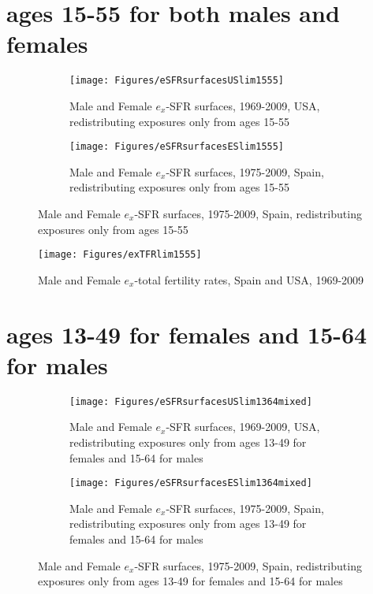 \section{ages 15-55 for both males and females}
\label{sec:1555}
\begin{figure}[ht!]
        \centering
        \begin{subfigure}
                \centering
                \caption{Male and Female $e_x$-SFR surfaces, 1969-2009, USA,
                redistributing exposures only from ages 15-55}
                \texttt{[image: Figures/eSFRsurfacesUSlim1555]}
                \label{fig:exSFRsurfUSlim15_55}
        \end{subfigure}
        \begin{subfigure}
                \centering
                \caption{Male and Female $e_x$-SFR surfaces, 1975-2009, Spain,
                redistributing exposures only from ages 15-55}
                \texttt{[image: Figures/eSFRsurfacesESlim1555]} 
                \label{fig:exSFRsurfESlim15_55}
        \end{subfigure}
\end{figure}

\begin{figure}[ht!]
        \centering  
          \caption{Male and Female $e_x$-total fertility rates, Spain
          and USA, 1969-2009}
           \texttt{[image: Figures/exTFRlim1555]}
          \label{fig:exTFRlim15_55}
\end{figure}
\pagebreak
\FloatBarrier

\section{ages 13-49 for females and 15-64 for males}
\label{sec:1364}
\begin{figure}[ht!]
        \centering
        \begin{subfigure}
                \centering
                \caption{Male and Female $e_x$-SFR surfaces, 1969-2009, USA,
                redistributing exposures only from ages 13-49 for females and 15-64 for males}
                \texttt{[image: Figures/eSFRsurfacesUSlim1364mixed]}
                \label{fig:exSFRsurfUSlim1364}
        \end{subfigure}
        \begin{subfigure}
                \centering
                \caption{Male and Female $e_x$-SFR surfaces, 1975-2009, Spain,
                redistributing exposures only from ages 13-49 for females and 15-64 for males}
                \texttt{[image: Figures/eSFRsurfacesESlim1364mixed]} 
                \label{fig:exSFRsurfESlim1364}
        \end{subfigure}
\end{figure}

